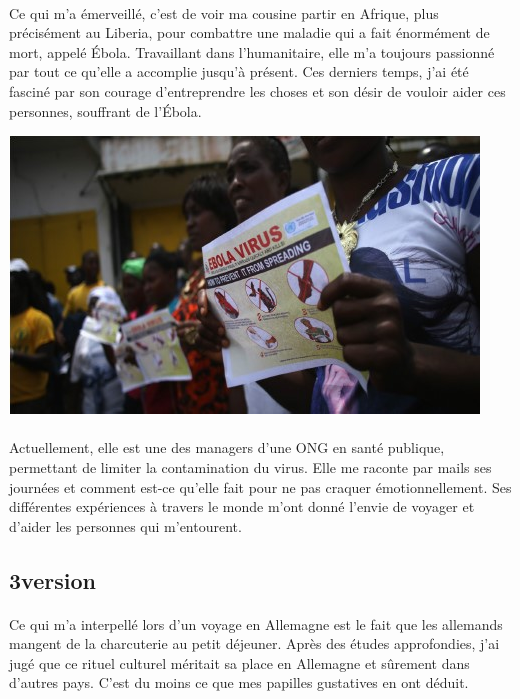 \paragraph{} Ce qui m'a émerveillé, c'est de voir ma cousine partir en Afrique,
plus précisément au Liberia, pour combattre une maladie qui a fait énormément
de mort, appelé Ébola.  Travaillant dans l'humanitaire, elle m'a toujours
passionné par tout ce qu'elle a accomplie jusqu'à présent. Ces derniers temps,
j'ai été fasciné par son courage d'entreprendre les choses et son désir de
vouloir aider ces personnes, souffrant de l'Ébola.

\begin{center}
	\includegraphics[scale=0.7]{Afrique2.jpg}
\end{center}

\paragraph{} Actuellement, elle est une des managers d'une ONG en santé
publique, permettant de limiter la contamination du virus. Elle me raconte par
mails ses journées et comment est-ce qu'elle fait pour ne pas craquer
émotionnellement. Ses différentes expériences à travers le monde m'ont donné
l'envie de voyager et d'aider les personnes qui m'entourent.

\subsection{3\ieme version}

\paragraph{} Ce qui m'a interpellé lors d'un voyage en Allemagne est le fait
que les allemands mangent de la charcuterie au petit déjeuner. Après des études
approfondies, j'ai jugé que ce rituel culturel méritait sa place en Allemagne
et sûrement dans d'autres pays. C'est du moins ce que mes papilles gustatives
en ont déduit.

